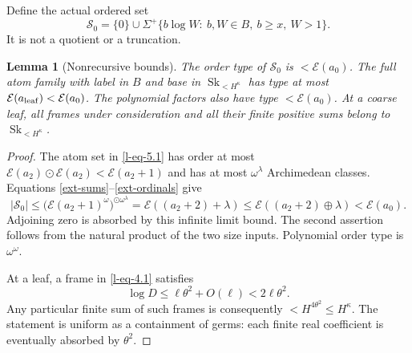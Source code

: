 \documentclass[11pt]{article}
\newtheorem{lemma}[theorem]{Lemma}
\theoremstyle{definition}
\theoremstyle{remark}
\newcommand{\Sk}{\operatorname{Sk}}
\newcommand{\hs}{\mathbin{\oplus}}
\newcommand{\od}{\mathbin{\odot}}
\newcommand{\EE}{\mathcal E}
\newcommand{\Bsmall}{\mathcal S_0}
\numberwithin{equation}{section}
\begin{document}
Define the actual ordered set
\begin{equation}
 \Bsmall=\{0\}\cup
 \Sigma^+\{b\log W:\ b,W\in B,\ b\ge x,\ W>1\}.
 \label{l-eq-5.1}
\end{equation}
It is not a quotient or a truncation.

\begin{lemma}[Nonrecursive bounds]\label{l-lem:payload}
The order type of $\Bsmall$ is $<\EE(a_0)$.
The full atom family with label in $B$ and base in
$\Sk_{<H^\kappa}$ has type at most $\EE(a_{\rm leaf})<\EE(a_0)$.
The polynomial factors also have type $<\EE(a_0)$.
At a coarse leaf, all frames under consideration and all their
finite positive sums belong to $\Sk_{<H^\kappa}$.
\end{lemma}
\begin{proof}
The atom set in \eqref{l-eq-5.1} has order at most
$\EE(a_2)\od\EE(a_2)<\EE(a_2+1)$ and has at most
$\omega^\lambda$ Archimedean classes.  Equations \eqref{ext-sums}--\eqref{ext-ordinals} give
\begin{equation}
 |\Bsmall|
 \le\bigl(\EE(a_2+1)^\omega\bigr)^{\od\omega^\lambda}
 =\EE((a_2+2)+\lambda)
 \le\EE((a_2+2)\hs\lambda)<\EE(a_0).
 \label{l-eq-5.2}
\end{equation}
Adjoining zero is absorbed by this infinite limit bound.
The second assertion follows from the natural product of the two
size inputs.  Polynomial order type is $\omega^\omega$.

At a leaf, a frame in \eqref{l-eq-4.1} satisfies
\begin{equation}
 \log D\le\ell\theta^2+O(\ell)<2\ell\theta^2.
 \label{l-eq-5.3}
\end{equation}
Any particular finite sum of such frames is consequently
$<H^{4\theta^2}\le H^\kappa$.
The statement is uniform as a containment of germs:
each finite real coefficient is eventually absorbed by $\theta^2$.
\end{proof}
\end{document}
